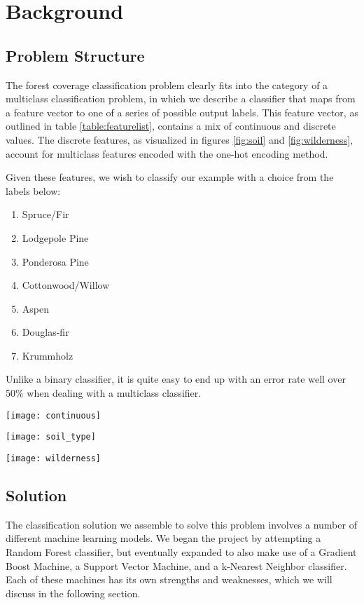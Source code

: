\section{Background}
\label{sec:-back}
\subsection{Problem Structure}
The forest coverage classification problem clearly fits into the 
category of a multiclass classification problem, in which we describe 
a classifier that maps from a feature vector to one of a series of 
possible output labels.  This feature vector, as outlined in table 
\ref{table:featurelist}, contains a mix of continuous and discrete 
values.  The discrete features, as visualized in figures \ref{fig:soil} 
and \ref{fig:wilderness}, account for multiclass features encoded with 
the one-hot encoding method.  

Given these features, we wish to classify our example with a choice 
from the labels 
below:
\begin{enumerate}
\item Spruce/Fir
\item Lodgepole Pine
\item Ponderosa Pine
\item Cottonwood/Willow
\item Aspen
\item Douglas-fir
\item Krummholz
\end{enumerate}

Unlike a binary classifier, it is quite easy to end up with an 
error rate well over 50\% when dealing with a multiclass 
classifier.


\begin{figure*}
\centering
\texttt{[image: continuous]}
 \caption{Continuous variables}
 \label{fig:continuous_features}
\end{figure*}

\begin{figure*}
\centering
\texttt{[image: soil\_type]}
 \caption{Soil types and accompanying cover types}
 \label{fig:soil}
\end{figure*}

\begin{figure*}
\centering
\texttt{[image: wilderness]}
 \caption{Wilderness types and accompanying cover types}
 \label{fig:wilderness}
\end{figure*}

\subsection{Solution}
The classification solution we assemble to solve this problem involves 
a number of different machine learning models.  We began the project by 
attempting a Random Forest classifier, but eventually expanded to also 
make use of a Gradient Boost Machine, a Support Vector Machine, and a 
k-Nearest Neighbor classifier.  Each of these machines has its own 
strengths and weaknesses, which we will discuss in the following section.


